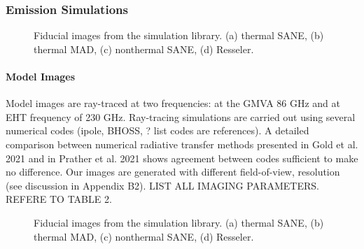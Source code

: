 \subsubsection{Emission Simulations}

\begin{figure*}
  \caption{Fiducial images from the simulation library.
    (a) thermal SANE, (b) thermal MAD, (c) nonthermal SANE, (d)
    Resseler.
    }
  \label{fig:fiducial_imgs}
\end{figure*}

\paragraph{Model Images}
Model images are ray-traced at two frequencies: at the GMVA 86 GHz and at EHT frequency of 230 GHz. Ray-tracing simulations are carried out using several numerical codes (ipole, BHOSS, ? list codes are references). A detailed comparison between numerical radiative transfer methods presented in Gold et al. 2021 and in Prather et al. 2021 shows agreement between codes sufficient to make no difference. Our images are generated with different field-of-view, resolution (see discussion in Appendix B2).
LIST ALL IMAGING PARAMETERS. REFERE TO TABLE 2.

\begin{figure*}
  \caption{Fiducial images from the simulation library.
    (a) thermal SANE, (b) thermal MAD, (c) nonthermal SANE, (d)
    Resseler.
    }
  \label{fig:fiducial_SEDs}
\end{figure*}

